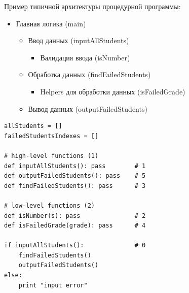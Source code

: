 {{      Пример типичной архитектуры процедурной программы:
      \vspace{0.5cm}
      \begin{itemize}
        \item Главная логика (main)
          \begin{itemize}
            \item Ввод данных (inputAllStudents)
              \begin{itemize}
                \item Валидация ввода (isNumber)
              \end{itemize}
            \item Обработка данных (findFailedStudents)
              \begin{itemize}
                \item Helpers для обработки данных (isFailedGrade)
              \end{itemize}
            \item Вывод данных (outputFailedStudents)
          \end{itemize}
      \end{itemize}
    }


\begin{frame}[fragile]
  \begin{verbatim}
allStudents = []
failedStudentsIndexes = []

# high-level functions (1)
def inputAllStudents(): pass        # 1
def outputFailedStudents(): pass    # 5
def findFailedStudents(): pass      # 3

# low-level functions (2)
def isNumber(s): pass               # 2
def isFailedGrade(grade): pass      # 4

if inputAllStudents():              # 0
    findFailedStudents()
    outputFailedStudents()
else:
    print "input error"
  \end{verbatim}
\end{frame}

}
